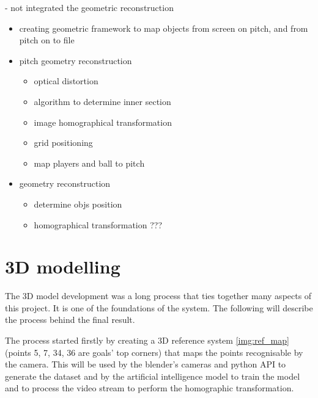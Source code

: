 \documentclass[
    11pt,
    oneside
]{report}
\begin{document}
- not integrated the geometric reconstruction


\begin{itemize}
\item
creating geometric framework to map objects from screen on pitch, and from pitch on to file
\end{itemize}

\begin{itemize}
\item
  pitch geometry reconstruction

  \begin{itemize}
  \item
    optical distortion
  \item
    algorithm to determine inner section
  \item
    image homographical transformation
  \item
    grid positioning
  \item
    map players and ball to pitch
  \end{itemize}
\end{itemize}


\begin{itemize}
\item
    geometry reconstruction
    \begin{itemize}
      \item
        determine objs position
      \item
        homographical transformation ???
    \end{itemize}
\end{itemize}





\section{3D modelling}


The 3D model development was a long process that ties together many aspects of this project. It is one of the foundations of the system. The following will describe the process behind the final result.


The process started firstly by creating a 3D reference system \ref{img:ref_map} (points 5, 7, 34, 36 are goals' top corners) that maps the points recognisable by the camera. This will be used by the blender's cameras and python API to generate the dataset and by the artificial intelligence model to train the model and to process the video stream to perform the homographic transformation.
\end{document}
